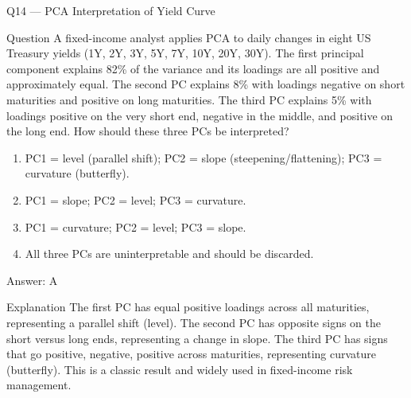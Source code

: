 \documentclass[aspectratio=169,8pt]{beamer}
\begin{document}
	\begin{frame}{Q14 --- PCA Interpretation of Yield Curve}
		\begin{block}{Question}
			A fixed-income analyst applies PCA to daily changes in eight US Treasury yields (1Y, 2Y, 3Y, 5Y, 7Y, 10Y, 20Y, 30Y). The first principal component explains 82\% of the variance and its loadings are all positive and approximately equal. The second PC explains 8\% with loadings negative on short maturities and positive on long maturities. The third PC explains 5\% with loadings positive on the very short end, negative in the middle, and positive on the long end. How should these three PCs be interpreted?
		\end{block}
		\begin{enumerate}
			\item PC1 = level (parallel shift); PC2 = slope (steepening/flattening); PC3 = curvature (butterfly).
			\item PC1 = slope; PC2 = level; PC3 = curvature.
			\item PC1 = curvature; PC2 = level; PC3 = slope.
			\item All three PCs are uninterpretable and should be discarded.
		\end{enumerate}
		\begin{exampleblock}{Answer: A}\end{exampleblock}
		\begin{block}{Explanation}
			The first PC has equal positive loadings across all maturities, representing a parallel shift (level). The second PC has opposite signs on the short versus long ends, representing a change in slope. The third PC has signs that go positive, negative, positive across maturities, representing curvature (butterfly). This is a classic result and widely used in fixed-income risk management.
		\end{block}
	\end{frame}
	
\end{document}
